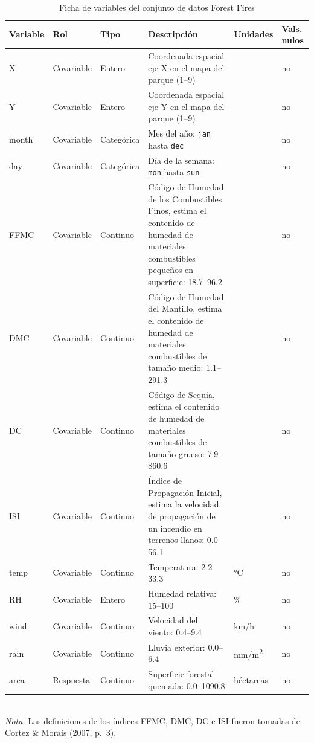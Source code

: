\begin{table}[h!]
\caption{Ficha de variables del conjunto de datos Forest Fires}
\label{tab:variables}
\footnotesize                          
\renewcommand{\arraystretch}{1.25}     
    \begin{tabularx}{\textwidth}{l l l X l l}
    \hline
    \textbf{Variable} & \textbf{Rol} & \textbf{Tipo} & \textbf{Descripción} & \textbf{Unidades} & \textbf{Vals. nulos} \\
    \hline
    X     & Covariable & Entero     & Coordenada espacial eje X en el mapa del parque (1--9)   &        & no \\
    Y     & Covariable & Entero     & Coordenada espacial eje Y en el mapa del parque (1--9)   &        & no \\
    month & Covariable & Categórica & Mes del año: \texttt{jan} hasta \texttt{dec}              &        & no \\
    day   & Covariable & Categórica & Día de la semana: \texttt{mon} hasta \texttt{sun}         &        & no \\
    FFMC  & Covariable & Continuo   & Código de Humedad de los Combustibles Finos, estima el contenido de humedad de materiales combustibles pequeños en superficie: 18.7--96.2                   &        & no \\
    DMC   & Covariable & Continuo   & Código de Humedad del Mantillo, estima el contenido de humedad de materiales combustibles de tamaño medio: 1.1--291.3                    &        & no \\
    DC    & Covariable & Continuo   & Código de Sequía, estima el contenido de humedad de materiales combustibles de tamaño grueso: 7.9--860.6                     &        & no \\
    ISI   & Covariable & Continuo   & Índice de Propagación Inicial, estima la velocidad de propagación de un incendio en terrenos llanos: 0.0--56.1                     &        & no \\
    temp  & Covariable & Continuo   & Temperatura: 2.2--33.3                                    & °C     & no \\
    RH    & Covariable & Entero     & Humedad relativa: 15--100                                 & \%     & no \\
    wind  & Covariable & Continuo   & Velocidad del viento: 0.4--9.4                            & km/h   & no \\
    rain  & Covariable & Continuo   & Lluvia exterior: 0.0--6.4                                 & mm/m\textsuperscript{2} & no \\
    area  & Respuesta  & Continuo   & Superficie forestal quemada: 0.0--1090.8                  & héctareas     & no \\
    \hline
    \end{tabularx}
\\[4pt]  %
{\footnotesize \textit{Nota.} Las definiciones de los índices FFMC, DMC, DC e ISI
fueron tomadas de Cortez \& Morais (2007, p.~3).}
\end{table}

